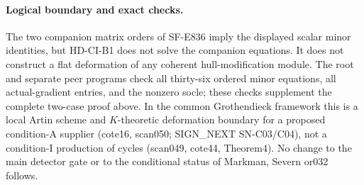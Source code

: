 \paragraph{Logical boundary and exact checks.}
The two companion matrix orders of SF-E836 imply the displayed scalar
minor identities, but HD-CI-B1 does not solve the companion equations.
It does not construct a flat deformation of any coherent hull-modification
module. The root and separate peer programs check all thirty-six ordered
minor equations, all actual-gradient entries, and the nonzero socle;
these checks supplement the complete two-case proof above.
In the common Grothendieck framework this is a local Artin scheme and
$K$-theoretic deformation boundary for a proposed condition-A supplier
(cote16, scan050; SIGN\_NEXT SN-C03/C04), not a condition-I production
of cycles (scan049, cote44, Theorem4). No change to the main detector
gate or to the conditional status of Markman, Severn or032 follows.
